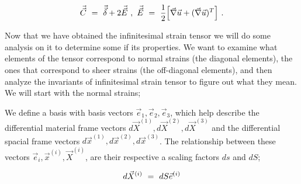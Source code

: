 \documentclass{article}
\begin{document}
\begin{equation} \label{eq:1}
\vec{\vec{C}} \hspace{0.125cm} = \hspace{0.125cm} \vec{\vec{\delta}} + 2 \vec{\vec{E}} \hspace{0.125cm} , \hspace{0.125cm} \vec{\vec{E}}  \hspace{0.125cm} = \hspace{0.125cm} \frac{1}{2} \Big[ \vec{\nabla} \vec{u} + ( \vec{\nabla} \vec{u} )^T \Big] \hspace{0.125cm} .
\end{equation} 

Now that we have obtained the infinitesimal strain tensor we will do some analysis on it to determine some if its properties. We want to examine what elements of the tensor correspond to normal strains (the diagonal elements), the ones that correspond to sheer strains (the off-diagonal elements), and then analyze the invariants of infinitesimal strain tensor to figure out what they mean. We will start with the normal strains;

We define a basis with basis vectors \begin{math} \vec{e}_1 ,  \vec{e}_2 ,  \vec{e}_3 \end{math}, which help describe the differential material frame vectors \begin{math} d \vec{X}^{( 1 )} , d \vec{X}^{( 2 )} , d \vec{X}^{( 3 )} \end{math} and the differential spacial frame vectors \begin{math} d \vec{x}^{( 1 )} ,  d \vec{x}^{( 2 )} , d \vec{x}^{( 3 )} \end{math}. The relationship between these vectors \begin{math} \vec{e}_i ,  \vec{x}^{( i )}  ,  \vec{X}^{( i )} \end{math}, are their respective a scaling factors \begin{math} ds \end{math} and \begin{math} dS \end{math};

\begin{equation} \label{eq:1}
d \vec{X}^{( i )}  \hspace{0.125cm} = \hspace{0.125cm} dS  \vec{e}^{( i )} 
\end{equation} 
\end{document}
